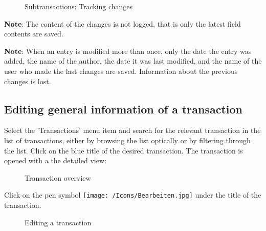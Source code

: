 \begin{figure}[H]
\caption{Subtransactions: Tracking changes}
\end{figure}

\textbf{Note}: The content of the changes is not logged, that is only the latest field contents are saved.

\vspace{\baselineskip}

\textbf{Note}: When an entry is modified more than once, only the date the entry was added, the name of the author, the date it was last modified, and the name of the user who made the last changes are saved. Information about the previous changes is lost.

\subsection{Editing general information of a transaction}

Select the 'Transactions' menu item and search for the relevant transaction in the list of transactions, either by browsing the list optically or by filtering through the list. Click on the blue title of the desired transaction. The transaction is opened with a the detailed view:

\begin{figure}[H]
\caption{Transaction overview}
\end{figure}

Click on the pen symbol \texttt{[image: /Icons/Bearbeiten.jpg]}  under the title of the transaction.

\begin{figure}[H]
\caption{Editing a transaction}
\end{figure}

